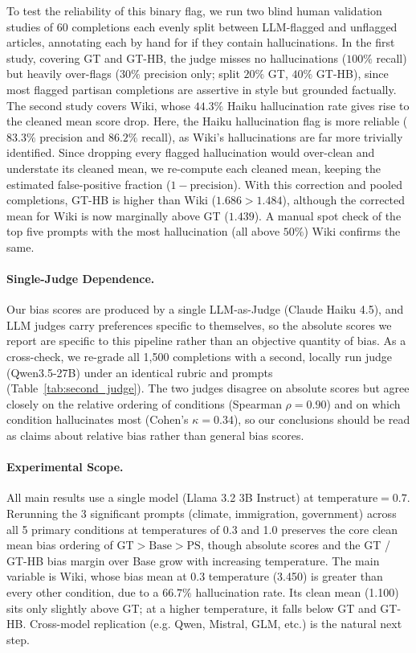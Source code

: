 \documentclass[11pt]{article}
\begin{document}
To test the reliability of this binary flag, we run two blind human validation studies of 60 completions each evenly split between LLM-flagged and unflagged articles, annotating each by hand for if they contain hallucinations.
In the first study, covering GT and GT-HB, the judge misses no hallucinations ($100\%$ recall) but heavily over-flags ($30\%$ precision only; split $20\%$ GT, $40\%$ GT-HB), since most flagged partisan completions are assertive in style but grounded factually.
The second study covers Wiki, whose $44.3\%$ Haiku hallucination rate gives rise to the cleaned mean score drop.
Here, the Haiku hallucination flag is more reliable ($83.3\%$ precision and $86.2\%$ recall), as Wiki's hallucinations are far more trivially identified.
Since dropping every flagged hallucination would over-clean and understate its cleaned mean, we re-compute each cleaned mean, keeping the estimated false-positive fraction ($1-\mathrm{precision}$).
With this correction and pooled completions, GT-HB is higher than Wiki ($1.686 > 1.484$), although the corrected mean for Wiki is now marginally above GT ($1.439$).
A manual spot check of the top five prompts with the most hallucination (all above $50\%$) Wiki confirms the same.


\paragraph{Single-Judge Dependence.}
Our bias scores are produced by a single LLM-as-Judge (Claude Haiku 4.5), and LLM judges carry preferences specific to themselves, so the absolute scores we report are specific to this pipeline rather than an objective quantity of bias.
As a cross-check, we re-grade all 1{,}500 completions with a second, locally run judge (Qwen3.5-27B) under an identical rubric and prompts (Table~\ref{tab:second_judge}).
The two judges disagree on absolute scores but agree closely on the relative ordering of conditions (Spearman $\rho=0.90$) and on which condition hallucinates most (Cohen's $\kappa = 0.34$), so our conclusions should be read as claims about relative bias rather than general bias scores.

\paragraph{Experimental Scope.}
All main results use a single model (Llama 3.2 3B Instruct) at $\mathrm{temperature} = 0.7$.
Rerunning the 3 significant prompts (climate, immigration, government) across all 5 primary conditions at temperatures of 0.3 and 1.0 preserves the core clean mean bias ordering of $\mathrm{GT} > \mathrm{Base} > \mathrm{PS}$, though absolute scores and the GT / GT-HB bias margin over Base grow with increasing temperature. 
The main variable is Wiki, whose bias mean at 0.3 temperature (3.450) is greater than every other condition, due to a $66.7\%$ hallucination rate. 
Its clean mean (1.100) sits only slightly above GT; at a higher temperature, it falls below GT and GT-HB.
Cross-model replication (e.g. Qwen, Mistral, GLM, etc.) is the natural next step.
\end{document}
